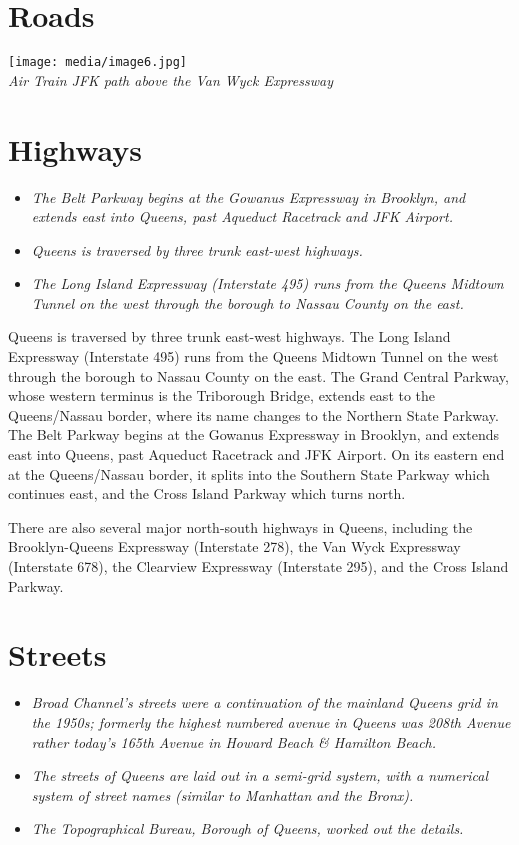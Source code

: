 \section{Roads}\label{roads}

\texttt{[image: media/image6.jpg]}\\
\emph{Air Train JFK path above the Van Wyck Expressway}

\section{Highways}\label{highways}

\begin{itemize}
\item
  \emph{The Belt Parkway begins at the Gowanus Expressway in Brooklyn,
  and extends east into Queens, past Aqueduct Racetrack and JFK
  Airport.}
\item
  \emph{Queens is traversed by three trunk east-west highways.}
\item
  \emph{The Long Island Expressway (Interstate 495) runs from the Queens
  Midtown Tunnel on the west through the borough to Nassau County on the
  east.}
\end{itemize}

Queens is traversed by three trunk east-west highways. The Long Island
Expressway (Interstate 495) runs from the Queens Midtown Tunnel on the
west through the borough to Nassau County on the east. The Grand Central
Parkway, whose western terminus is the Triborough Bridge, extends east
to the Queens/Nassau border, where its name changes to the Northern
State Parkway. The Belt Parkway begins at the Gowanus Expressway in
Brooklyn, and extends east into Queens, past Aqueduct Racetrack and JFK
Airport. On its eastern end at the Queens/Nassau border, it splits into
the Southern State Parkway which continues east, and the Cross Island
Parkway which turns north.

There are also several major north-south highways in Queens, including
the Brooklyn-Queens Expressway (Interstate 278), the Van Wyck Expressway
(Interstate 678), the Clearview Expressway (Interstate 295), and the
Cross Island Parkway.

\section{Streets}\label{streets}

\begin{itemize}
\item
  \emph{Broad Channel's streets were a continuation of the mainland
  Queens grid in the 1950s; formerly the highest numbered avenue in
  Queens was 208th Avenue rather today's 165th Avenue in Howard Beach \&
  Hamilton Beach.}
\item
  \emph{The streets of Queens are laid out in a semi-grid system, with a
  numerical system of street names (similar to Manhattan and the
  Bronx).}
\item
  \emph{The Topographical Bureau, Borough of Queens, worked out the
  details.}
\end{itemize}


